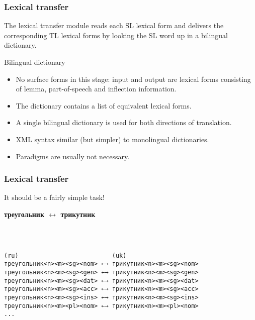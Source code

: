 \documentclass[10pt,xetex]{beamer} %
\begin{document}
\begin{frame}
  \frametitle{Lexical transfer}

\begin{block}{}

The lexical transfer module reads each SL lexical form and delivers the
corresponding TL lexical forms by looking the SL word up in a bilingual dictionary.
\end{block}
\begin{block}{Bilingual dictionary}
\begin{itemize}
  \item No surface forms in this stage: input and output are lexical forms consisting of lemma, part-of-speech and inflection information.
  \item The dictionary contains a list of equivalent lexical forms.
  \item A single bilingual dictionary is used for both directions of translation.
  \item XML syntax similar (but simpler) to monolingual dictionaries.
  \item Paradigms are usually not necessary.
\end{itemize}
\end{block}
\end{frame}

\begin{frame}[fragile]
 \frametitle{Lexical transfer}

It should be a fairly simple task!

\begin{center}
 {\bf треугольник $\leftrightarrow$ трикутник}
\end{center}
~\\

\begin{verbatim}

(ru)                          (uk)
треугольник<n><m><sg><nom> ←→ трикутник<n><m><sg><nom>
треугольник<n><m><sg><gen> ←→ трикутник<n><m><sg><gen>
треугольник<n><m><sg><dat> ←→ трикутник<n><m><sg><dat>
треугольник<n><m><sg><acc> ←→ трикутник<n><m><sg><acc>
треугольник<n><m><sg><ins> ←→ трикутник<n><m><sg><ins>
треугольник<n><m><pl><nom> ←→ трикутник<n><m><pl><nom>
...

\end{verbatim}
\end{frame}
\end{document}
